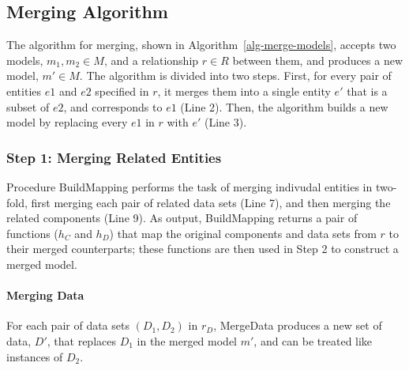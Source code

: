 \subsection{Merging Algorithm}

The algorithm for merging, shown in Algorithm~\ref{alg-merge-models},
accepts two models, $m_{1}, m_{2} \in M$, and a relationship $r \in R$
between them, and produces a new model, $m' \in M$. The algorithm is
divided into two steps. First, for every pair of entities $e1$ and
$e2$ specified in $r$, it merges them into a single entity $e'$ that is a
subset of $e2$, and corresponds to $e1$ (Line 2). Then, the algorithm
builds a new model by replacing every $e1$ in $r$ with $e'$ (Line 3).


\subsubsection{Step 1: Merging Related Entities}

Procedure \textsf{BuildMapping} performs the task of merging indivudal
entities in two-fold, first merging each pair of related data sets
(Line 7), and then merging the related components (Line
9). As output, \textsf{BuildMapping} returns a pair of functions
($h_{C}$ and $h_{D}$) that map the original components and data sets
from $r$ to their merged counterparts; these functions are then used
in Step 2 to construct a merged model.


\paragraph{\textbf{Merging Data}} For each pair of data sets $(D_{1},
D_{2})$ in $r_{D}$, \textsf{MergeData} produces a new set of data, $D'$,
that replaces $D_{1}$ in the merged model $m'$, and can be treated
like instances of $D_{2}$. 

